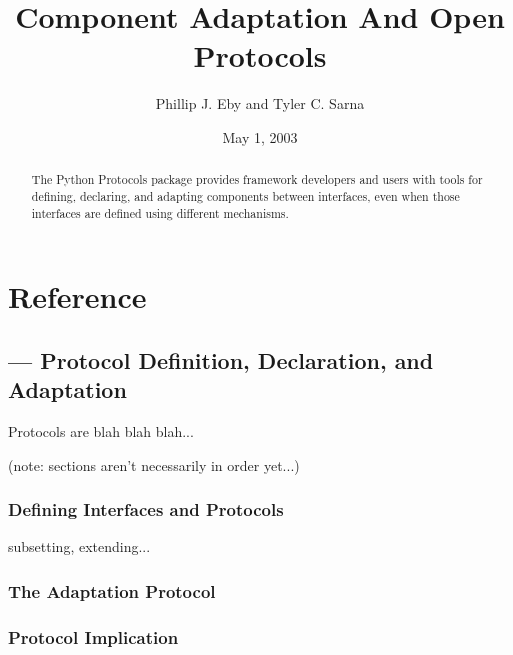 \documentclass{manual}
\title{Component Adaptation And Open Protocols}
\author{Phillip J. Eby and Tyler C. Sarna}
\date{May 1, 2003}       %
\begin{document}
\maketitle


%

\begin{abstract}

\noindent

The Python Protocols package provides framework developers and users with
tools for defining, declaring, and adapting components between interfaces,
even when those interfaces are defined using different mechanisms.

\end{abstract}

\tableofcontents

\chapter{Reference}

\section{ ---
         Protocol Definition, Declaration, and Adaptation}

Protocols are blah blah blah...

(note: sections aren't necessarily in order yet...)

\subsection{Defining Interfaces and Protocols}
subsetting, extending...

\subsection{The Adaptation Protocol}

\subsection{Protocol Implication}
\end{document}
